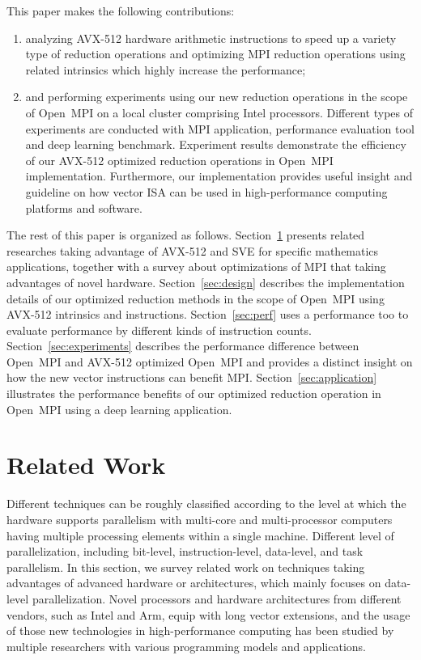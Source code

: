 \documentclass[sigconf]{acmart}
\newcommand{\ompi}[0]{Open~MPI\xspace}
\newcommand{\mpi}[0]{\textsc{MPI}\xspace}
\newcommand{\sve}[0]{\textsc{SVE}\xspace}
\begin{document}
This paper makes the following contributions:
\begin{enumerate}
  \item analyzing AVX-512 hardware arithmetic instructions to speed up a variety
  type of reduction operations and optimizing \mpi reduction operations using
  related intrinsics which highly increase the performance;
  \item and performing experiments using our new reduction operations in the scope
  of \ompi on a local cluster comprising Intel processors. Different types of
  experiments are conducted with \mpi application, performance evaluation tool and
  deep learning benchmark.
  Experiment results demonstrate the efficiency of our AVX-512 optimized reduction
  operations in \ompi implementation.
  Furthermore, our implementation provides useful insight and guideline on how vector
  ISA can be used in high-performance computing platforms and software.
\end{enumerate}

The rest of this paper is organized as follows.
Section~\ref{sec:related} presents related researches taking advantage of AVX-512 and \sve for specific mathematics applications, together with a survey about optimizations of \mpi that taking advantages of novel hardware.
Section~\ref{sec:design} describes the implementation details of our optimized reduction methods in the scope of \ompi using AVX-512 intrinsics and instructions.
Section~\ref{sec:perf} uses a performance too to evaluate performance by different kinds of instruction counts.
Section~\ref{sec:experiments} describes the performance difference between
\ompi and AVX-512 optimized \ompi and provides a distinct insight on how the
new vector instructions can benefit \mpi.
Section~\ref{sec:application} illustrates the performance benefits of our
optimized reduction operation in \ompi using a deep learning application.

\section{Related Work}\label{sec:related}
Different techniques can be roughly classified according to the level at which
the hardware supports parallelism with multi-core and multi-processor computers having
multiple processing elements within a single machine. Different level of parallelization,
including bit-level, instruction-level, data-level, and task parallelism.
%
In this section, we survey related work on techniques taking advantages of
advanced hardware or architectures, which mainly focuses on data-level parallelization.
Novel processors and hardware architectures from different vendors, such as Intel and Arm,
equip with long vector extensions, and the usage of those new technologies in high-performance computing has been
studied by multiple researchers with various programming models and applications.
%
\end{document}
